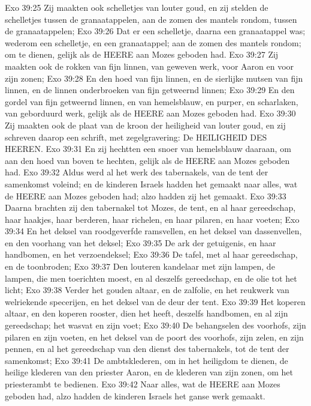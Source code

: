 Exo 39:25  Zij maakten ook schelletjes van louter goud, en zij stelden de schelletjes tussen de granaatappelen, aan de zomen des mantels rondom, tussen de granaatappelen;
Exo 39:26  Dat er een schelletje, daarna een granaatappel was; wederom een schelletje, en een granaatappel; aan de zomen des mantels rondom; om te dienen, gelijk als de HEERE aan Mozes geboden had.
Exo 39:27  Zij maakten ook de rokken van fijn linnen, van geweven werk, voor Aaron en voor zijn zonen;
Exo 39:28  En den hoed van fijn linnen, en de sierlijke mutsen van fijn linnen, en de linnen onderbroeken van fijn getweernd linnen;
Exo 39:29  En den gordel van fijn getweernd linnen, en van hemelsblauw, en purper, en scharlaken, van geborduurd werk, gelijk als de HEERE aan Mozes geboden had.
Exo 39:30  Zij maakten ook de plaat van de kroon der heiligheid van louter goud, en zij schreven daarop een schrift, met zegelgravering: De HEILIGHEID DES HEEREN.
Exo 39:31  En zij hechtten een snoer van hemelsblauw daaraan, om aan den hoed van boven te hechten, gelijk als de HEERE aan Mozes geboden had.
Exo 39:32  Aldus werd al het werk des tabernakels, van de tent der samenkomst voleind; en de kinderen Israels hadden het gemaakt naar alles, wat de HEERE aan Mozes geboden had; alzo hadden zij het gemaakt.
Exo 39:33  Daarna brachten zij den tabernakel tot Mozes, de tent, en al haar gereedschap, haar haakjes, haar berderen, haar richelen, en haar pilaren, en haar voeten;
Exo 39:34  En het deksel van roodgeverfde ramsvellen, en het deksel van dassenvellen, en den voorhang van het deksel;
Exo 39:35  De ark der getuigenis, en haar handbomen, en het verzoendeksel;
Exo 39:36  De tafel, met al haar gereedschap, en de toonbroden;
Exo 39:37  Den louteren kandelaar met zijn lampen, de lampen, die men toerichten moest, en al deszelfs gereedschap, en de olie tot het licht;
Exo 39:38  Verder het gouden altaar, en de zalfolie, en het reukwerk van welriekende specerijen, en het deksel van de deur der tent.
Exo 39:39  Het koperen altaar, en den koperen rooster, dien het heeft, deszelfs handbomen, en al zijn gereedschap; het wasvat en zijn voet;
Exo 39:40  De behangselen des voorhofs, zijn pilaren en zijn voeten, en het deksel van de poort des voorhofs, zijn zelen, en zijn pennen, en al het gereedschap van den dienst des tabernakels, tot de tent der samenkomst;
Exo 39:41  De ambtsklederen, om in het heiligdom te dienen, de heilige klederen van den priester Aaron, en de klederen van zijn zonen, om het priesterambt te bedienen.
Exo 39:42  Naar alles, wat de HEERE aan Mozes geboden had, alzo hadden de kinderen Israels het ganse werk gemaakt.
